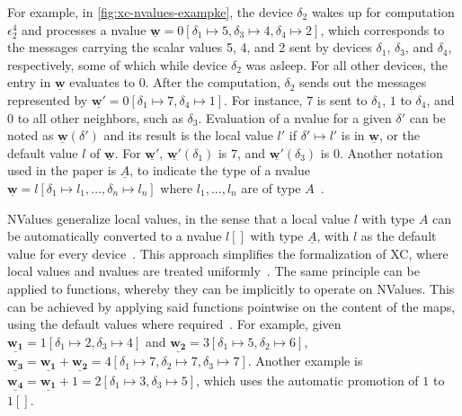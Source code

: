 For example, in \cref{fig:xc-nvalues-exampke}, the device $\delta_2$ wakes up for computation $\epsilon_2^4$ and processes a nvalue $\underline{\mathbf{w}} = 0[\delta_1 \mapsto 5, \delta_3 \mapsto 4, \delta_4 \mapsto 2]$, which corresponds to the messages carrying the scalar values 5, 4, and 2 sent by devices $\delta_1$, $\delta_3$, and $\delta_4$, respectively, some of which while device $\delta_2$ was asleep.
%
For all other devices, the entry in $\underline{\mathbf{w}}$ evaluates to $0$.
%
After the computation, $\delta_2$ sends out the messages represented by $\underline{\mathbf{w'}} = 0[\delta_1 \mapsto 7, \delta_4 \mapsto 1]$.
%
For instance, $7$ is sent to $\delta_1$, $1$ to $\delta_4$, and $0$ to all other neighbors, such as $\delta_3$.
%
Evaluation of a nvalue for a given $\delta'$ can be noted as $\underline{\mathbf{w}}(\delta')$ and its result is the local value $l'$ if $\delta' \mapsto l'$ is in $\underline{\mathbf{w}}$, or the default value $l$ of $\underline{\mathbf{w}}$.
%
For $\underline{\mathbf{w'}}$, $\underline{\mathbf{w'}}(\delta_1)$ is $7$, and $\underline{\mathbf{w'}}(\delta_3)$ is 0.
%
Another notation used in the paper is $\underline{A}$, to indicate the type of a nvalue $\underline{\mathbf{w}} = l[\delta_1 \mapsto l_1, ..., \delta_n \mapsto l_n]$ where $l_1, ..., l_n$ are of type $A$~\cite{xc}.

NValues generalize local values, in the sense that a local value $l$ with type $A$ can be automatically converted to a nvalue $l[]$ with type $\underline{A}$, with $l$ as the default value for every device~\cite{xc}.
%
This approach simplifies the formalization of \ac{XC}, where local values and nvalues are treated uniformly~\cite{xc}.
%
The same principle can be applied to functions,  whereby they can be implicitly  to operate on NValues.
%
This can be achieved by applying said functions pointwise on the content of the maps, using the default values where required~\cite{xc}.
%
For example, given $\underline{\mathbf{w_1}} = 1[\delta_1 \mapsto 2, \delta_3 \mapsto 4]$ and $\underline{\mathbf{w_2}} = 3[\delta_1 \mapsto 5, \delta_2 \mapsto 6]$, $\underline{\mathbf{w_3}} = \underline{\mathbf{w_1}} + \underline{\mathbf{w_2}} = 4[\delta_1 \mapsto 7, \delta_2 \mapsto 7, \delta_3 \mapsto 7]$.
%
Another example is $\underline{\mathbf{w_4}} = \underline{\mathbf{w_1}} + 1 = 2[\delta_1 \mapsto 3, \delta_3 \mapsto 5]$, which uses the automatic promotion of $1$ to $1[]$.

